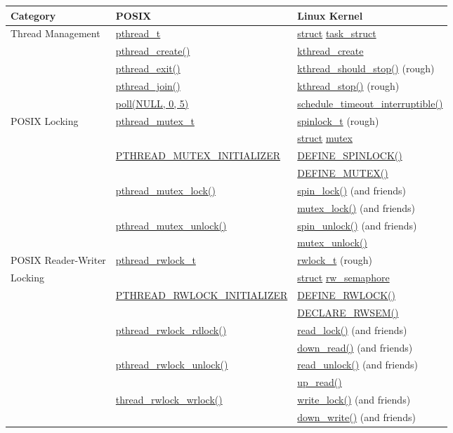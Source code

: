 \begin{table}
\begin{center}
\begin{tabular}{l|l|l}
	Category & POSIX & Linux Kernel \\
	\hline
	\hline
	Thread Management
		& \url{pthread_t}
			& \url{struct} \url{task_struct} \\
	\cline{2-3}
		& \url{pthread_create()}
			& \url{kthread_create} \\
	\cline{2-3}
		& \url{pthread_exit()}
			& \url{kthread_should_stop()} (rough) \\
	\cline{2-3}
		& \url{pthread_join()}
			& \url{kthread_stop()} (rough) \\
	\cline{2-3}
		& \url{poll(NULL, 0, 5)}
			& \url{schedule_timeout_interruptible()} \\
	\hline
	\hline
	POSIX Locking
		& \url{pthread_mutex_t}
			& \url{spinlock_t} (rough) \\
		&	& \url{struct} \url{mutex} \\
	\cline{2-3}
		& \url{PTHREAD_MUTEX_INITIALIZER}
			& \url{DEFINE_SPINLOCK()} \\
		&	& \url{DEFINE_MUTEX()} \\
	\cline{2-3}
		& \url{pthread_mutex_lock()}
			& \url{spin_lock()} (and friends) \\
		&	& \url{mutex_lock()} (and friends) \\
	\cline{2-3}
		& \url{pthread_mutex_unlock()}
			& \url{spin_unlock()} (and friends) \\
		&	& \url{mutex_unlock()} \\
	\hline
	\hline
	POSIX Reader-Writer
		& \url{pthread_rwlock_t}
			& \url{rwlock_t} (rough) \\
	Locking	&	& \url{struct} \url{rw_semaphore} \\
	\cline{2-3}
		& \url{PTHREAD_RWLOCK_INITIALIZER}
			& \url{DEFINE_RWLOCK()} \\
		&	& \url{DECLARE_RWSEM()} \\
	\cline{2-3}
		& \url{pthread_rwlock_rdlock()}
			& \url{read_lock()} (and friends) \\
		&	& \url{down_read()} (and friends) \\
	\cline{2-3}
		& \url{pthread_rwlock_unlock()}
			& \url{read_unlock()} (and friends) \\
		&	& \url{up_read()} \\
	\cline{2-3}
		& \url{thread_rwlock_wrlock()}
			& \url{write_lock()} (and friends) \\
		&	& \url{down_write()} (and friends) \\

\end{tabular}
\end{center}
\end{table}
